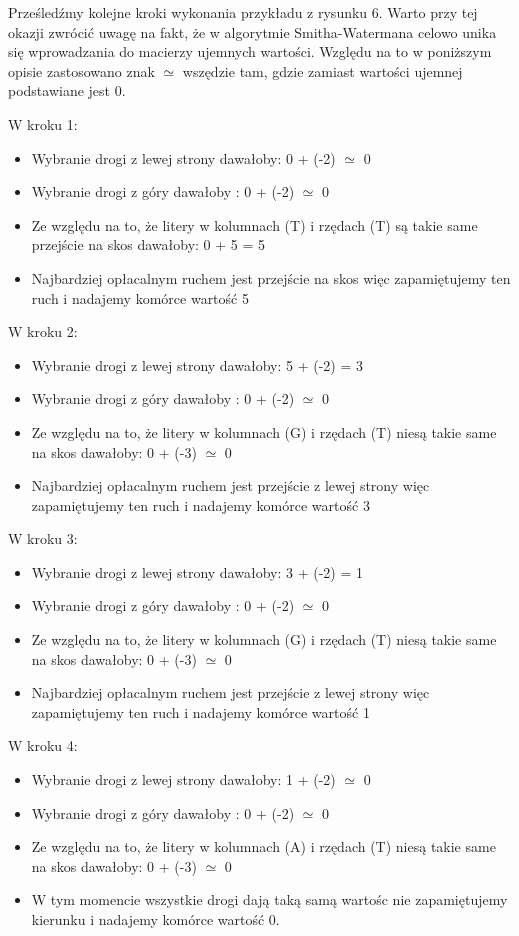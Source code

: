\documentclass[a4paper,12pt]{article}
\newenvironment{lista}{
\begin{itemize}
  \setlength{\itemsep}{1pt}
  \setlength{\parskip}{0pt}
  \setlength{\parsep}{0pt}
}{\end{itemize}}
\begin{document}
Prześledźmy kolejne kroki wykonania przykładu z rysunku 6. Warto przy tej okazji zwrócić uwagę na fakt, że w algorytmie Smitha-Watermana celowo unika się wprowadzania do macierzy ujemnych wartości. Względu na to w poniższym opisie zastosowano znak $\simeq$ wszędzie tam, gdzie zamiast wartości ujemnej podstawiane jest 0.

W kroku 1:
\begin{lista}
\item Wybranie drogi z lewej strony dawałoby: 0 + (-2) $\simeq$ 0
\item Wybranie drogi z góry dawałoby : 0 + (-2) $\simeq$ 0
\item Ze względu na to, że litery w kolumnach (T) i rzędach (T) są takie same przejście na skos dawałoby: 0 + 5 = 5
\item Najbardziej opłacalnym ruchem jest przejście na skos więc zapamiętujemy ten ruch i nadajemy komórce wartość 5
\end{lista}

W kroku 2:
\begin{lista}
\item Wybranie drogi z lewej strony dawałoby: 5 + (-2) = 3
\item Wybranie drogi z góry dawałoby : 0 + (-2) $\simeq$ 0
\item Ze względu na to, że litery w kolumnach (G) i rzędach (T) niesą takie same na skos dawałoby: 0 + (-3) $\simeq$ 0
\item Najbardziej opłacalnym ruchem jest przejście z lewej strony więc zapamiętujemy ten ruch i nadajemy komórce wartość 3
\end{lista}

W kroku 3:
\begin{lista}
\item Wybranie drogi z lewej strony dawałoby: 3 + (-2) = 1
\item Wybranie drogi z góry dawałoby : 0 + (-2) $\simeq$ 0
\item Ze względu na to, że litery w kolumnach (G) i rzędach (T) niesą takie same na skos dawałoby: 0 + (-3) $\simeq$ 0
\item Najbardziej opłacalnym ruchem jest przejście z lewej strony więc zapamiętujemy ten ruch i nadajemy komórce wartość 1
\end{lista}

W kroku 4:
\begin{lista}
\item Wybranie drogi z lewej strony dawałoby: 1 + (-2) $\simeq$ 0
\item Wybranie drogi z góry dawałoby : 0 + (-2) $\simeq$ 0
\item Ze względu na to, że litery w kolumnach (A) i rzędach (T) niesą takie same na skos dawałoby: 0 + (-3) $\simeq$ 0
\item W tym momencie wszystkie drogi dają taką samą wartośc nie zapamiętujemy kierunku i nadajemy komórce wartość 0.
\end{lista}
\end{document}
